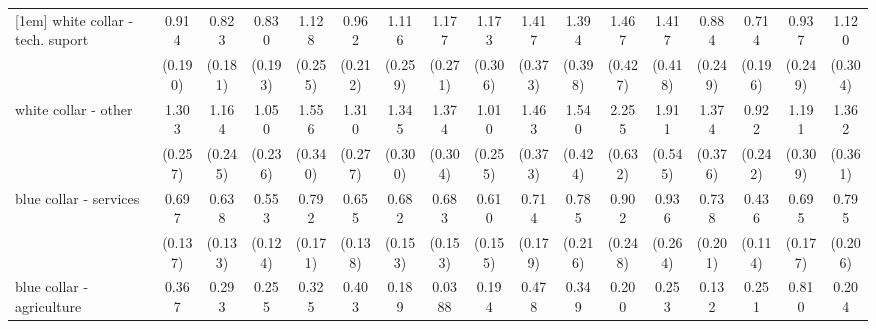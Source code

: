 {\begin{tabular}{l*{16}{c}}
[1em]
white collar - tech. suport&       0.914         &       0.823         &       0.830         &       1.128         &       0.962         &       1.116         &       1.177         &       1.173         &       1.417         &       1.394         &       1.467         &       1.417         &       0.884         &       0.714         &       0.937         &       1.120         \\
                    &     (0.190)         &     (0.181)         &     (0.193)         &     (0.255)         &     (0.212)         &     (0.259)         &     (0.271)         &     (0.306)         &     (0.373)         &     (0.398)         &     (0.427)         &     (0.418)         &     (0.249)         &     (0.196)         &     (0.249)         &     (0.304)         \\
[1em]
white collar - other&       1.303         &       1.164         &       1.050         &       1.556\sym{*}  &       1.310         &       1.345         &       1.374         &       1.010         &       1.463         &       1.540         &       2.255\sym{**} &       1.911\sym{*}  &       1.374         &       0.922         &       1.191         &       1.362         \\
                    &     (0.257)         &     (0.245)         &     (0.236)         &     (0.340)         &     (0.277)         &     (0.300)         &     (0.304)         &     (0.255)         &     (0.373)         &     (0.424)         &     (0.632)         &     (0.545)         &     (0.376)         &     (0.242)         &     (0.309)         &     (0.361)         \\
[1em]
blue collar - services&       0.697         &       0.638\sym{*}  &       0.553\sym{**} &       0.792         &       0.655\sym{*}  &       0.682         &       0.683         &       0.610         &       0.714         &       0.785         &       0.902         &       0.936         &       0.738         &       0.436\sym{**} &       0.695         &       0.795         \\
                    &     (0.137)         &     (0.133)         &     (0.124)         &     (0.171)         &     (0.138)         &     (0.153)         &     (0.153)         &     (0.155)         &     (0.179)         &     (0.216)         &     (0.248)         &     (0.264)         &     (0.201)         &     (0.114)         &     (0.177)         &     (0.206)         \\
[1em]
blue collar - agriculture&       0.367         &       0.293         &       0.255\sym{*}  &       0.325         &       0.403         &       0.189\sym{*}  &      0.0388\sym{***}&       0.194\sym{**} &       0.478         &       0.349         &       0.200\sym{*}  &       0.253         &       0.132\sym{*}  &       0.251\sym{*}  &       0.810         &       0.204\sym{**} \\

\end{tabular}}
